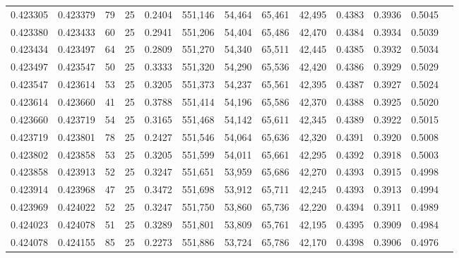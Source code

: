 \begin{tabular}{rrrrrrrrrrrrr}
0.423305 & 0.423379 &    79 &  25 &                                     0.2404 & 551,146 &  54,464 &  65,461 &  42,495 & 0.4383 & 0.3936 & 0.5045 \\
0.423380 & 0.423433 &    60 &  25 &                                     0.2941 & 551,206 &  54,404 &  65,486 &  42,470 & 0.4384 & 0.3934 & 0.5039 \\
0.423434 & 0.423497 &    64 &  25 &                                     0.2809 & 551,270 &  54,340 &  65,511 &  42,445 & 0.4385 & 0.3932 & 0.5034 \\
0.423497 & 0.423547 &    50 &  25 &                                     0.3333 & 551,320 &  54,290 &  65,536 &  42,420 & 0.4386 & 0.3929 & 0.5029 \\
0.423547 & 0.423614 &    53 &  25 &                                     0.3205 & 551,373 &  54,237 &  65,561 &  42,395 & 0.4387 & 0.3927 & 0.5024 \\
0.423614 & 0.423660 &    41 &  25 &                                     0.3788 & 551,414 &  54,196 &  65,586 &  42,370 & 0.4388 & 0.3925 & 0.5020 \\
0.423660 & 0.423719 &    54 &  25 &                                     0.3165 & 551,468 &  54,142 &  65,611 &  42,345 & 0.4389 & 0.3922 & 0.5015 \\
0.423719 & 0.423801 &    78 &  25 &                                     0.2427 & 551,546 &  54,064 &  65,636 &  42,320 & 0.4391 & 0.3920 & 0.5008 \\
0.423802 & 0.423858 &    53 &  25 &                                     0.3205 & 551,599 &  54,011 &  65,661 &  42,295 & 0.4392 & 0.3918 & 0.5003 \\
0.423858 & 0.423913 &    52 &  25 &                                     0.3247 & 551,651 &  53,959 &  65,686 &  42,270 & 0.4393 & 0.3915 & 0.4998 \\
0.423914 & 0.423968 &    47 &  25 &                                     0.3472 & 551,698 &  53,912 &  65,711 &  42,245 & 0.4393 & 0.3913 & 0.4994 \\
0.423969 & 0.424022 &    52 &  25 &                                     0.3247 & 551,750 &  53,860 &  65,736 &  42,220 & 0.4394 & 0.3911 & 0.4989 \\
0.424023 & 0.424078 &    51 &  25 &                                     0.3289 & 551,801 &  53,809 &  65,761 &  42,195 & 0.4395 & 0.3909 & 0.4984 \\
0.424078 & 0.424155 &    85 &  25 &                                     0.2273 & 551,886 &  53,724 &  65,786 &  42,170 & 0.4398 & 0.3906 & 0.4976 \\

\end{tabular}
